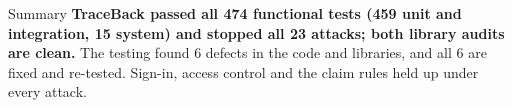 \documentclass[11pt,a4paper]{article}
\begin{document}
\begin{keybox}{Summary}
\textbf{TraceBack passed all 474 functional tests (459 unit and integration, 15 system) and stopped all 23 attacks; both library audits are clean.} The testing found 6 defects in the code and libraries, and all 6 are fixed and re-tested. Sign-in, access control and the claim rules held up under every attack.
\end{keybox}
\vspace{2pt}{\setlength{\parskip}{1pt}\tableofcontents}\newpage

\end{document}
